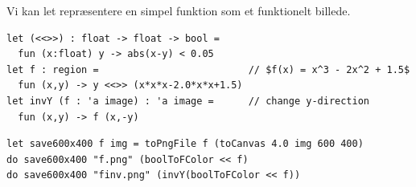 \documentclass[rgb]{beamer}
\begin{document}
\begin{frame}[fragile]
\begin{footnotesize}


  \vspace{1ex}

  Vi kan let repræsentere en simpel funktion som et funktionelt billede.

\begin{lstlisting}[numbers=none,frame=none,mathescape]
let (<<>>) : float -> float -> bool =
  fun (x:float) y -> abs(x-y) < 0.05
let f : region =                          // $f(x) = x^3 - 2x^2 + 1.5$
  fun (x,y) -> y <<>> (x*x*x-2.0*x*x+1.5)
let invY (f : 'a image) : 'a image =      // change y-direction
  fun (x,y) -> f (x,-y)
\end{lstlisting}


\begin{lstlisting}[numbers=none,frame=none,mathescape]
let save600x400 f img = toPngFile f (toCanvas 4.0 img 600 400)
do save600x400 "f.png" (boolToFColor << f)
do save600x400 "finv.png" (invY(boolToFColor << f))
\end{lstlisting}

  \vspace{1ex}

\hfill
{}\hfill
{}

\end{footnotesize}
\end{frame}
\end{document}
